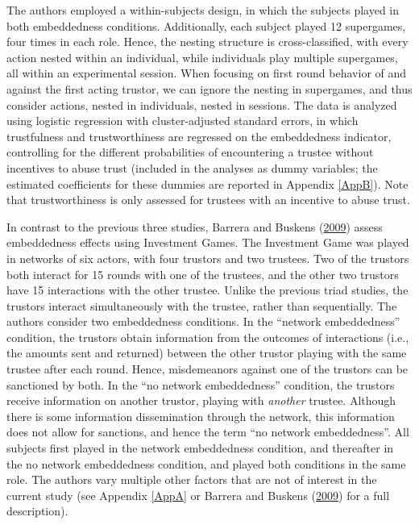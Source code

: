 \documentclass[
  11pt,
]{article}
\begin{document}
The authors employed a within-subjects design, in which the subjects played in both embeddedness conditions.
Additionally, each subject played 12 supergames, four times in each role. Hence, the nesting structure is cross-classified, with every action nested within an individual, while individuals play multiple supergames, all within an experimental session.
When focusing on first round behavior of and against the first acting trustor, we can ignore the nesting in supergames, and thus consider actions, nested in individuals, nested in sessions.
The data is analyzed using logistic regression with cluster-adjusted standard errors, in which trustfulness and trustworthiness are regressed on the embeddedness indicator, controlling for the different probabilities of encountering a trustee without incentives to abuse trust (included in the analyses as dummy variables; the estimated coefficients for these dummies are reported in Appendix \ref{AppB}).
Note that trustworthiness is only assessed for trustees with an incentive to abuse trust.

In contrast to the previous three studies, Barrera and Buskens (\protect\hyperlink{ref-barrera_buskens_third_2009}{2009}) assess embeddedness effects using Investment Games.
The Investment Game was played in networks of six actors, with four trustors and two trustees.
Two of the trustors both interact for 15 rounds with one of the trustees, and the other two trustors have 15 interactions with the other trustee.
Unlike the previous triad studies, the trustors interact simultaneously with the trustee, rather than sequentially.
The authors consider two embeddedness conditions.
In the ``network embeddedness'' condition, the trustors obtain information from the outcomes of interactions (i.e., the amounts sent and returned) between the other trustor playing with the same trustee after each round.
Hence, misdemeanors against one of the trustors can be sanctioned by both.
In the ``no network embeddedness'' condition, the trustors receive information on another trustor, playing with \emph{another} trustee.
Although there is some information dissemination through the network, this information does not allow for sanctions, and hence the term ``no network embeddedness''.
All subjects first played in the network embeddedness condition, and thereafter in the no network embeddedness condition, and played both conditions in the same role.
The authors vary multiple other factors that are not of interest in the current study (see Appendix \ref{AppA} or Barrera and Buskens (\protect\hyperlink{ref-barrera_buskens_third_2009}{2009}) for a full description).
\end{document}
